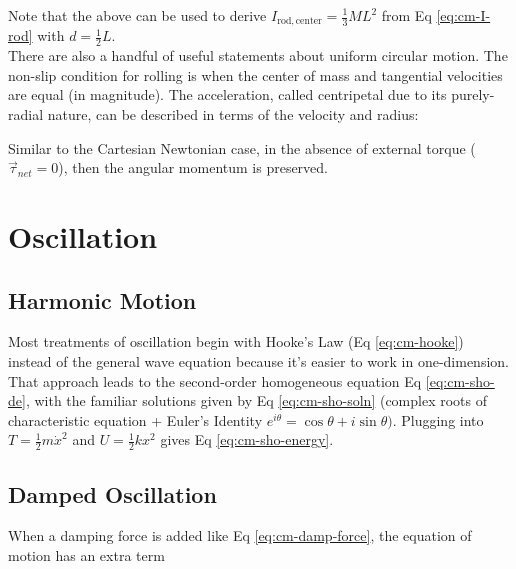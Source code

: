Note that the above can be used to derive $I_{\mathrm{rod,center}} = \frac{1}{3}ML^2$ from Eq \ref{eq:cm-I-rod} with $d = \frac{1}{2}L$.\\

There are also a handful of useful statements about uniform circular motion. The non-slip condition for rolling is when the center of mass and tangential velocities are equal (in magnitude). The acceleration, called centripetal due to its purely-radial nature, can be described in terms of the velocity and radius:




Similar to the Cartesian Newtonian case, in the absence of external torque ($\vec{\tau}_{net}=0$), then the angular momentum is preserved.


\newpage
\section{Oscillation}
\label{sec:cm-oscillation}
\subsection{Harmonic Motion}
Most treatments of oscillation begin with Hooke's Law (Eq \ref{eq:cm-hooke}) instead of the general wave equation because it's easier to work in one-dimension. That approach leads to the second-order homogeneous equation Eq \ref{eq:cm-sho-de}, with the familiar solutions given by Eq \ref{eq:cm-sho-soln} (complex roots of characteristic equation + Euler's Identity $e^{i\theta} = \cos{\theta} + i\sin{\theta})$. Plugging into $T = \frac{1}{2}m\dot{x}^2$ and $U = \frac{1}{2}kx^2$ gives Eq \ref{eq:cm-sho-energy}.





\subsection{Damped Oscillation}
When a damping force is added like Eq \ref{eq:cm-damp-force}, the equation of motion has an extra term 

